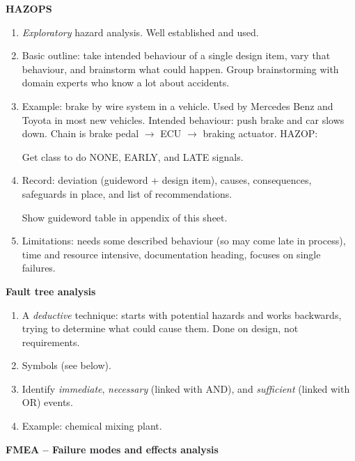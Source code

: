 \documentclass[11pt]{article}
\begin{document}
\textbf{HAZOPS}

\begin{enumerate}

 \item \emph{Exploratory} hazard analysis. Well established and used.

 \item Basic outline: take intended behaviour of a single design item, vary that behaviour, and brainstorm what could happen. Group brainstorming with domain experts who know a lot about accidents.

 \item Example: brake by wire system in a vehicle. Used by Mercedes Benz and Toyota in most new vehicles. Intended behaviour: push brake and car slows down. Chain is brake pedal $\rightarrow$ ECU $\rightarrow$ braking actuator. HAZOP:

   Get class to do NONE, EARLY, and LATE signals.

 \item Record: deviation (guideword + design item), causes, consequences, safeguards in place, and list of recommendations.

  Show guideword table in appendix of this sheet.

 \item Limitations: needs some described behaviour (so may come late in process), time and resource intensive, documentation heading, focuses on single failures.

\end{enumerate}

\textbf{Fault tree analysis}

\begin{enumerate}

 \item A \emph{deductive} technique: starts with potential hazards and works backwards, trying to determine what could cause them. Done on design, not requirements.

 \item Symbols (see below).

 \item Identify \emph{immediate}, \emph{necessary} (linked with AND), and \emph{sufficient} (linked with OR) events.

 \item Example: chemical mixing plant.

\end{enumerate}

\textbf{FMEA -- Failure modes and effects analysis}
\end{document}
